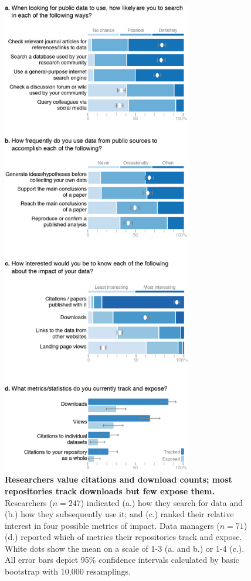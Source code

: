 \documentclass[english]{article}
\begin{document}
\begin{figure}[!ht]
\begin{center}
\includegraphics[width=3.25in]{MDC_Figure.png}
\end{center}
\caption{
{\bf Researchers value citations and download counts; most repositories track downloads but few expose them.}
Researchers ($n=247$) indicated (a.) how they search for data and (b.) how they subsequently use it; and (c.) ranked their relative interest in four possible metrics of impact.
Data managers ($n=71$) (d.) reported which of metrics their repositories track and expose.
White dots show the mean on a scale of 1-3 (a. and b.) or 1-4 (c.).
All error bars depict 95\% confidence intervals calculated by basic bootstrap with 10,000 resamplings. 
}
\label{fig:results}
\end{figure}
\end{document}
